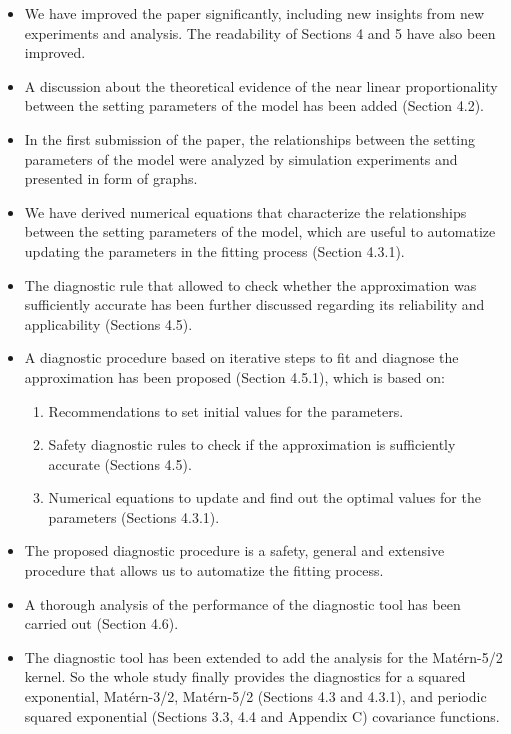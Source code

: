 \documentclass[11pt]{report}
\begin{document}
\begin{itemize}

\item We have improved the paper significantly, including new insights from new experiments and analysis. The readability of Sections 4 and 5 have also been improved.

\item A discussion about the theoretical evidence of the near linear proportionality between the setting parameters of the model has been added (Section 4.2). 

\item In the first submission of the paper, the relationships between the setting parameters of the model were analyzed by simulation experiments and presented in form of graphs. 

\item We have derived numerical equations that characterize the relationships between the setting parameters of the model, which are useful to automatize updating the parameters in the fitting process (Section 4.3.1). 

\item The diagnostic rule that allowed to check whether the approximation was sufficiently accurate has been further discussed regarding its reliability and applicability (Sections 4.5).

\item A diagnostic procedure based on iterative steps to fit and diagnose the approximation has been proposed (Section 4.5.1), which is based on:

\begin{enumerate}
\item Recommendations to set initial values for the parameters.
\item Safety diagnostic rules to check if the approximation is sufficiently accurate (Sections 4.5).
\item Numerical equations to update and find out the optimal values for the parameters (Sections 4.3.1).
\end{enumerate}

\item The proposed diagnostic procedure is a safety, general and extensive procedure that allows us to automatize the fitting process.

\item A thorough analysis of the performance of the diagnostic tool has been carried out (Section 4.6).

\item The diagnostic tool has been extended to add the analysis for the Mat\'ern-5/2 kernel. So the whole study finally provides the diagnostics for a squared exponential, Mat\'ern-3/2, Mat\'ern-5/2 (Sections 4.3 and 4.3.1), and periodic squared exponential (Sections 3.3, 4.4 and Appendix C) covariance functions. 


\end{itemize}
\end{document}

